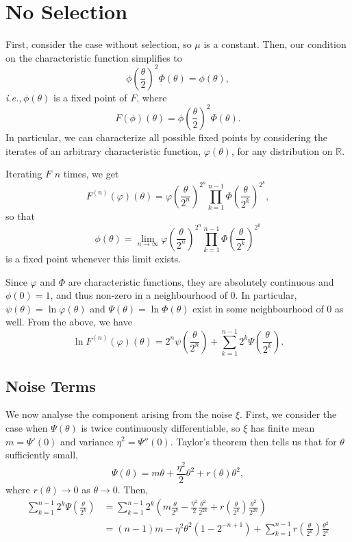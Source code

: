 \documentclass{article}
\newcommand{\ie}{\textit{i.e.,}\,}
\theoremstyle{remark}
\theoremstyle{definition}
\begin{document}
\section{No Selection}

First, consider the case without selection, so $\mu$ is a constant.  Then, our condition on the characteristic function simplifies to
\begin{equation}\label{CHARACTERISTIC}
	{\textstyle \phi\left(\frac{\theta}{2}\right)^{2}} \Phi(\theta) %
	= \phi(\theta),
\end{equation}
\ie $\phi(\theta)$ is a fixed point of $F$, where
 \[
	F(\phi)(\theta) = {\textstyle \phi\left(\frac{\theta}{2}\right)^{2}} \Phi(\theta).
\]
In particular, we can characterize all possible fixed points by considering the iterates of an arbitrary characteristic function, $\varphi(\theta)$, for  any distribution on $\mathbb{R}$.  

Iterating $F$ $n$ times, we get
\[
	F^{(n)}(\varphi)(\theta)
	=  {\textstyle \varphi\left(\frac{\theta}{2^{n}}\right)^{2^{n}}}\prod_{k=1}^{n-1} {\textstyle \Phi\left(\frac{\theta}{2^{k}}\right)^{2^{k}}},
\]
so that
\[
	\phi(\theta) = \lim_{n \to \infty} \varphi\left(\frac{\theta}{2^{n}}\right)^{2^{n}}\prod_{k=1}^{n-1}\Phi\left(\frac{\theta}{2^{k}}\right)^{2^{k}}
\]
is a fixed point whenever this limit exists.  

Since $\varphi$ and $\Phi$ are characteristic functions, they are absolutely continuous and $\phi(0) = 1$, and thus non-zero in a neighbourhood of 0. In particular, $\psi(\theta) = \ln{\varphi}(\theta)$ and $\Psi(\theta) = \ln{\Phi(\theta)}$ exist in some neighbourhood of 0 as well.  From the above, we have
\[
	\ln{F^{(n)}(\varphi)(\theta)} = {\textstyle 2^{n} \psi\left(\frac{\theta}{2^{n}}\right)} 
		+ \sum_{k=1}^{n-1}  {\textstyle 2^{k} \Psi\left(\frac{\theta}{2^{k}}\right)}.
\]

\subsection{Noise Terms}

We now analyse the component arising from the noise $\xi$.  First, we consider the case when $\Psi(\theta)$ is twice continuously differentiable, so $\xi$ has finite mean $m = \Psi'(0)$
and variance $\eta^{2} = \Psi''(0)$.   Taylor's theorem then tells us that for $\theta$ sufficiently small, 
\[
	\Psi(\theta) = m\theta + \frac{\eta^{2}}{2} \theta^{2} + r(\theta)\theta^{2},
\]
where $r(\theta) \to 0$ as $\theta \to 0$.  Then,
\begin{align*}
	 \sum_{k=1}^{n-1}  {\textstyle 2^{k} \Psi\left(\frac{\theta}{2^{k}}\right)}
	 &=  \sum_{k=1}^{n-1} 2^{k} {\textstyle \left(m \frac{\theta}{2^{k}} - \frac{\eta^{2}}{2}  \frac{\theta^{2}}{2^{2k}}
		+ r\left(\frac{\theta}{2^{k}}\right)\frac{\theta^{2}}{2^{2k}}\right)}\\
	&= (n-1) m - \eta^{2} \theta^{2} (1 - 2^{-n+1}) 
		+ \sum_{k=1}^{n-1} {\textstyle r\left(\frac{\theta}{2^{k}}\right)\frac{\theta^{2}}{2^{k}}}
 \end{align*}
\end{document}
